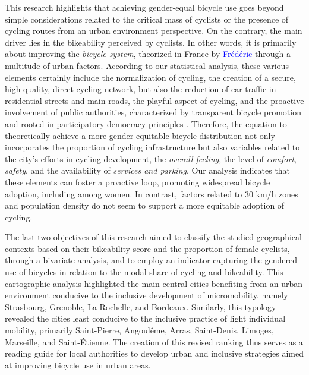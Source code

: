 \begin{refsegment}
This research highlights that achieving gender-equal bicycle use goes beyond simple considerations related to the critical mass of cyclists or the presence of cycling routes from an urban environment perspective. On the contrary, the main driver lies in the bikeability perceived by cyclists. In other words, it is primarily about improving the \textsl{bicycle system}, theorized in France by \textcolor{blue}{Frédéric} \textcolor{blue}{\textcite[169]{heran_retour_2015}} through a multitude of urban factors. According to our statistical analysis, these various elements certainly include the normalization of cycling, the creation of a secure, high-quality, direct cycling network, but also the reduction of car traffic in residential streets and main roads, the playful aspect of cycling, and the proactive involvement of public authorities, characterized by transparent bicycle promotion and rooted in participatory democracy principles \textcolor{blue}{\autocite{heran_systeme_2001}}. Therefore, the equation to theoretically achieve a more gender-equitable bicycle distribution not only incorporates the proportion of cycling infrastructure but also variables related to the city's efforts in cycling development, the \textsl{overall feeling}, the level of \textsl{comfort}, \textsl{safety}, and the availability of \textsl{services and parking}. Our analysis indicates that these elements can foster a proactive loop, promoting widespread bicycle adoption, including among women. In contrast, factors related to 30 km/h zones and population density do not seem to support a more equitable adoption of cycling.%

The last two objectives of this research aimed to classify the studied geographical contexts based on their bikeability score and the proportion of female cyclists, through a bivariate analysis, and to employ an indicator capturing the gendered use of bicycles in relation to the modal share of cycling and bikeability. This cartographic analysis highlighted the main central cities benefiting from an urban environment conducive to the inclusive development of micromobility, namely Strasbourg, Grenoble, La Rochelle, and Bordeaux. Similarly, this typology revealed the cities least conducive to the inclusive practice of light individual mobility, primarily Saint-Pierre, Angoulême, Arras, Saint-Denis, Limoges, Marseille, and Saint-Étienne. The creation of this revised ranking thus serves as a reading guide for local authorities to develop urban and inclusive strategies aimed at improving bicycle use in urban areas.%


\end{refsegment}
